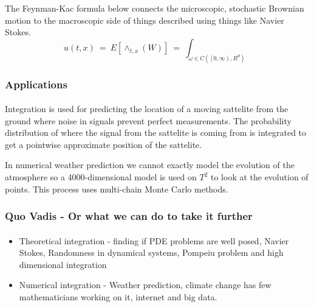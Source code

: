 \documentclass[12pt,a4paper]{article}
\begin{document}
\begin{addmargin}[-6em]{-6em}
	The Feynman-Kac formula below connects the microscopic, stochastic Brownian motion to the macroscopic side of things described using things like Navier Stokes.
	\begin{equation*}
	u(t,x) \ = \ E\left[\wedge_{t,x}\left(W\right)\right] \ = \ \int_{\omega\in C\left(\left[0,\infty\right),\mathit{R}^d\right)}
	\end{equation*}
	
	\vspace{-5mm}
	\subsubsection*{Applications}
	\vspace{-3mm}
	\paragraph{}Integration is used for predicting the location of a moving sattelite from the ground where noise in signals prevent perfect measurements. The probability distribution of where the signal from the sattelite is coming from is integrated to get a pointwise approximate position of the sattelite.
	
	In numerical weather prediction we cannot exactly model the evolution of the atmosphere so a 4000-dimensional model is used on $\mathit{T}^2$ to look at the evolution of points. This process uses multi-chain Monte Carlo methods.
	\vspace{-3mm}
	\subsubsection*{Quo Vadis - Or what we can do to take it further}
	\vspace{-3mm}
	\paragraph{}
	\begin{itemize}
		\vspace{-3mm}
		\item Theoretical integration - finding if PDE problems are well posed, Navier Stokes, Randomness in dynamical systems, Pompeiu problem and high dimensional integration
		\vspace{-3mm}
		\item Numerical integration - Weather prediction, climate change has few mathematicians working on it, internet and big data.
	\end{itemize}
\end{addmargin}	
\end{document}
